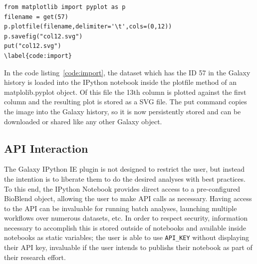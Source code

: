 \documentclass{bioinfo}
\begin{document}
\begin{methods}
\begin{lstlisting}[frame=single]
from matplotlib import pyplot as p
filename = get(57)
p.plotfile(filename,delimiter='\t',cols=(0,12))
p.savefig("col12.svg")
put("col12.svg")
\label{code:import}
\end{lstlisting}
In the code listing~\ref{code:import}, the dataset which has the ID 57 in the Galaxy history is loaded into the IPython notebook inside the
plotfile method of an matplolib.pyplot object. Of this file the 13th column is plotted against the first column and the
resulting plot is stored as a SVG file. The put command copies the image into the Galaxy history, so it is now persistently
stored and can be downloaded or shared like any other Galaxy object.

\subsection{API Interaction}
The Galaxy IPython IE plugin is not designed to restrict the user, but instead the intention is to liberate
them to do the desired analyses with best practices. To this end, the IPython Notebook provides direct access to a pre-configured
BioBlend object, allowing the user to make API calls as necessary. Having access to the API can be invaluable for running
batch analyses, launching multiple workflows over numerous datasets, etc. In order to respect security, information necessary
to accomplish this is stored outside of notebooks and available inside notebooks as static variables; the user is able to use
\texttt{API\_KEY} without displaying their API key, invaluable if the user intends to publishs their notebook as
part of their research effort.

%
%
%
%
%
%
%
%
%
%



\end{methods}
\end{document}
